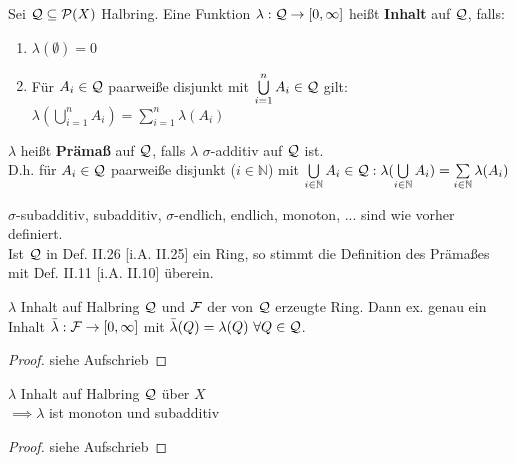 \documentclass[11pt,a4paper,fleqn,openany]{report}
\begin{document}
    \begin{definition}[i.A. II.25]
      Sei $\mathcal{Q} \subseteq \mathcal{P}(X)$ Halbring. Eine Funktion $\lambda: \mathcal{Q} \to [0, \infty]$ heißt \textbf{Inhalt} auf $\mathcal{Q}$, falls:
      \begin{enumerate}[label=\roman*)]
        \item $\lambda(\emptyset) = 0$
        \item Für $A_i \in \mathcal{Q}$ paarweiße disjunkt mit $\bigcup\limits_{i=1}^n A_i \in \mathcal{Q}$ gilt: $\lambda(\bigcup\limits_{i=1}^n A_i) = \sum\limits_{i=1}^n \lambda(A_i)$
      \end{enumerate}
      $\lambda$ heißt \textbf{Prämaß} auf $\mathcal{Q}$, falls $\lambda$ $\sigma$-additiv auf $\mathcal{Q}$ ist.\\
      D.h. für $A_i \in \mathcal{Q}$ paarweiße disjunkt ($i \in \mathbb{N}$) mit $\bigcup\limits_{i \in \mathbb{N}} A_i \in \mathcal{Q}: \lambda(\bigcup\limits_{i \in \mathbb{N}} A_i) = \sum\limits_{i \in \mathbb{N}} \lambda(A_i)$
    \end{definition}

    \begin{remark}
      $\sigma$-subadditiv, subadditiv, $\sigma$-endlich, endlich, monoton, ... sind wie vorher definiert.\\
      Ist $\mathcal{Q}$ in Def. II.26 [i.A. II.25] ein Ring, so stimmt die Definition des Prämaßes mit Def. II.11 [i.A. II.10] überein.
    \end{remark}

    \begin{theorem}[i.A. II.26]
      $\lambda$ Inhalt auf Halbring $\mathcal{Q}$ und $\mathcal{F}$ der von $\mathcal{Q}$ erzeugte Ring. Dann ex. genau ein Inhalt $\bar{\lambda}:\mathcal{F} \to [0, \infty]$ mit $\bar{\lambda}(Q)=\lambda(Q) \ \forall Q \in \mathcal{Q}$.
    \end{theorem}

    \begin{proof}
      siehe Aufschrieb
    \end{proof}

    \begin{lemma}[i.A. II.27]
      $\lambda$ Inhalt auf Halbring $\mathcal{Q}$ über $X$\\
      $\implies \lambda$ ist monoton und subadditiv
    \end{lemma}

    \begin{proof}
      siehe Aufschrieb
    \end{proof}
\end{document}
